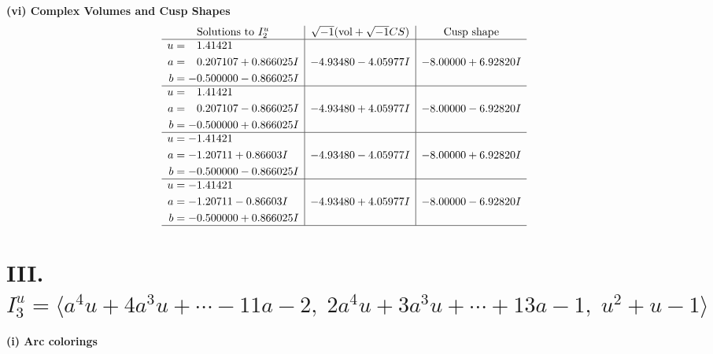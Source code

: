 \documentclass[1p]{elsarticle_modified}
\theoremstyle{definition}
\newcommand{\I}{\sqrt{-1}}
\begin{document}
\newpage\flushleft \textbf{(vi) Complex Volumes and Cusp Shapes}
$$\begin{array}{c|c|c}  
\text{Solutions to }I^u_{2}& \I (\text{vol} + \sqrt{-1}CS) & \text{Cusp shape}\\
 \hline 
\begin{aligned}
u &= \phantom{-}1.41421\phantom{ +0.000000I} \\
a &= \phantom{-}0.207107 + 0.866025 I \\
b &= -0.500000 - 0.866025 I\end{aligned}
 & -4.93480 - 4.05977 I & -8.00000 + 6.92820 I \\ \hline\begin{aligned}
u &= \phantom{-}1.41421\phantom{ +0.000000I} \\
a &= \phantom{-}0.207107 - 0.866025 I \\
b &= -0.500000 + 0.866025 I\end{aligned}
 & -4.93480 + 4.05977 I & -8.00000 - 6.92820 I \\ \hline\begin{aligned}
u &= -1.41421\phantom{ +0.000000I} \\
a &= -1.20711 + 0.86603 I \\
b &= -0.500000 - 0.866025 I\end{aligned}
 & -4.93480 - 4.05977 I & -8.00000 + 6.92820 I \\ \hline\begin{aligned}
u &= -1.41421\phantom{ +0.000000I} \\
a &= -1.20711 - 0.86603 I \\
b &= -0.500000 + 0.866025 I\end{aligned}
 & -4.93480 + 4.05977 I & -8.00000 - 6.92820 I\\
 \hline 
 \end{array}$$\newpage\newpage\renewcommand{\arraystretch}{1}
\centering \section*{III. $I^u_{3}= \langle a^4 u+4 a^3 u+\cdots-11 a-2,\;2 a^4 u+3 a^3 u+\cdots+13 a-1,\;u^2+u-1 \rangle$}
\flushleft \textbf{(i) Arc colorings}\\
\end{document}
